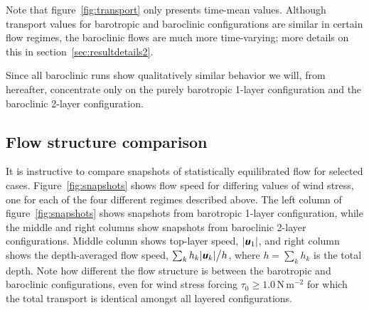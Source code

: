 \documentclass{agujournal2019}
\newcommand{\mathbfit}[1]{\textbf{\textit{\textsf{#1}}}}
\newcommand{\bu}		{\mathbfit u}
\newcommand{\Pa}		{\mathrm{N}\,\mathrm{m}^{-2}}
\begin{document}
Note that figure~\ref{fig:transport} only presents time-mean values. Although transport values for barotropic and baroclinic configurations are similar in certain flow regimes, the baroclinic flows are much more time-varying; more details on this in section~\ref{sec:resultdetails2}.

Since all baroclinic runs show qualitatively similar behavior we will, from hereafter, concentrate only on the purely barotropic 1-layer configuration and the baroclinic 2-layer configuration.

\subsection{Flow structure comparison}

It is instructive to compare snapshots of statistically equilibrated flow for selected cases. Figure~\ref{fig:snapshots} shows flow speed for differing values of wind stress, one for each of the four different regimes described above. The left column of figure~\ref{fig:snapshots} shows snapshots from barotropic 1-layer configuration, while the middle and right columns show snapshots from baroclinic 2-layer configurations. Middle column shows top-layer speed, $|\bu_1|$, and right column shows the depth-averaged flow speed, $\sum_k h_k|\bu_k| \big/ h$, where $h=\sum_k h_k$ is the total depth. Note how different the flow structure is between the barotropic and baroclinic configurations, even for wind stress forcing $\tau_0\ge 1.0\,\Pa$ for which the total transport is identical amongst all layered configurations.
\end{document}
